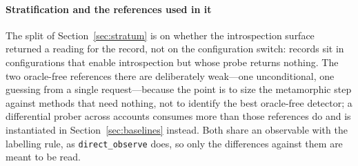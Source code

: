 \paragraph{Stratification and the references used in it} The split of Section~\ref{sec:stratum}
is on whether the introspection surface returned a reading for the record, not on the
configuration switch: \MiiFlagOnButUnavailable{} records sit in configurations that enable
introspection but whose probe returns nothing. The two oracle-free references there are
deliberately weak---one unconditional, one guessing from a single request---because the point is
to size the metamorphic step against methods that need nothing, not to identify the best
oracle-free detector; a differential prober across accounts consumes more than those references
do and is instantiated in Section~\ref{sec:baselines} instead. Both share an observable with the
labelling rule, as \texttt{direct\_observe} does, so only the differences against them are meant
to be read.
